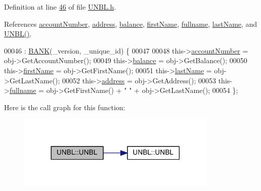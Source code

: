 Definition at line \hyperlink{_u_n_b_l_8h_source_l00046}{46} of file \hyperlink{_u_n_b_l_8h_source}{U\+N\+B\+L.\+h}.



References \hyperlink{_u_n_b_l_8h_source_l00095}{account\+Number}, \hyperlink{_u_n_b_l_8h_source_l00097}{address}, \hyperlink{_u_n_b_l_8h_source_l00096}{balance}, \hyperlink{_u_n_b_l_8h_source_l00093}{first\+Name}, \hyperlink{_u_n_b_l_8h_source_l00092}{fullname}, \hyperlink{_u_n_b_l_8h_source_l00094}{last\+Name}, and \hyperlink{_u_n_b_l_8h_source_l00024}{U\+N\+B\+L()}.


\begin{DoxyCode}
00046                                                                 : \hyperlink{class_b_a_n_k_a0bc938356cebff14fb0560264abe5a34_a0bc938356cebff14fb0560264abe5a34}{BANK}(\_version, \_unique\_id) \{
00047  
00048         this->\hyperlink{class_u_n_b_l_a90763c3044159862bcb9cd51d6b09f34_a90763c3044159862bcb9cd51d6b09f34}{accountNumber} = obj->GetAccountNumber();
00049         this->\hyperlink{class_u_n_b_l_afbe674996d7fddaffb55654e6a79f03b_afbe674996d7fddaffb55654e6a79f03b}{balance} = obj->GetBalance();
00050         this->\hyperlink{class_u_n_b_l_acee1595bf1914ac220f7c810b174bd16_acee1595bf1914ac220f7c810b174bd16}{firstName} = obj->GetFirstName();
00051         this->\hyperlink{class_u_n_b_l_a3f42790177cbe310536f53a7369ee194_a3f42790177cbe310536f53a7369ee194}{lastName} = obj->GetLastName();
00052         this->\hyperlink{class_u_n_b_l_acdaf39211e9b9c190a69bbbc590543e3_acdaf39211e9b9c190a69bbbc590543e3}{address} = obj->GetAddress();
00053         this->\hyperlink{class_u_n_b_l_a67deb62f553fe1ece6feb73f12898e7a_a67deb62f553fe1ece6feb73f12898e7a}{fullname} = obj->GetFirstName() + \textcolor{stringliteral}{" "} + obj->GetLastName();
00054     \};
\end{DoxyCode}


Here is the call graph for this function\+:\nopagebreak
\begin{figure}[H]
\begin{center}
\leavevmode
\includegraphics[width=270pt]{class_u_n_b_l_abbd578fbd58cf6f2143f17b3011f6c21_abbd578fbd58cf6f2143f17b3011f6c21_cgraph}
\end{center}
\end{figure}



